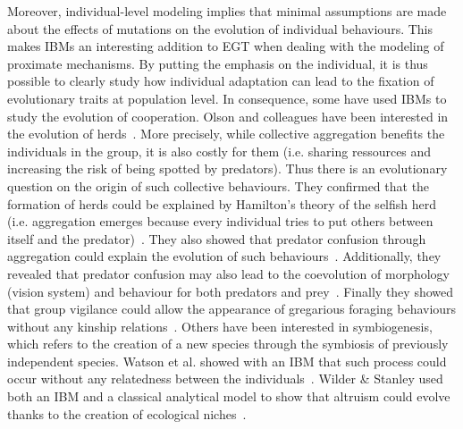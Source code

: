     Moreover, individual-level modeling implies that minimal assumptions are made about the effects of mutations on the evolution of individual behaviours. This makes IBMs an interesting addition to EGT when dealing with the modeling of proximate mechanisms. By putting the emphasis on the individual, it is thus possible to clearly study how individual adaptation can lead to the fixation of evolutionary traits at population level. In consequence, some have used IBMs to study the evolution of cooperation. Olson and colleagues have been interested in the evolution of herds~\parencite{Olson2013a}. More precisely, while collective aggregation benefits the individuals in the group, it is also costly for them (i.e. sharing ressources and increasing the risk of being spotted by predators). Thus there is an evolutionary question on the origin of such collective behaviours. They confirmed that the formation of herds could be explained by Hamilton's theory of the selfish herd (i.e. aggregation emerges because every individual tries to put others between itself and the predator)~\parencite{Hamilton1971}. They also showed that predator confusion through aggregation could explain the evolution of such behaviours~\parencite{Olson2013}. Additionally, they revealed that predator confusion may also lead to the coevolution of morphology (vision system) and behaviour for both predators and prey~\parencite{Olson2016}. Finally they showed that group vigilance could allow the appearance of gregarious foraging behaviours without any kinship relations~\parencite{Olson2014a}. Others have been interested in symbiogenesis, which refers to the creation of a new species through the symbiosis of previously independent species. Watson et al. showed with an IBM that such process could occur without any relatedness between the individuals~\parencite{Watson1992}. Wilder \& Stanley used both an IBM and a classical analytical model to show that altruism could evolve thanks to the creation of ecological niches~\parencite{Wilder2015}. 

